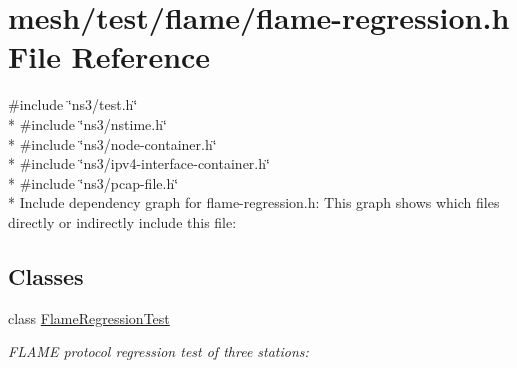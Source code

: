 \hypertarget{flame-regression_8h}{}\section{mesh/test/flame/flame-\/regression.h File Reference}
\label{flame-regression_8h}
{\ttfamily \#include \char`\"{}ns3/test.\+h\char`\"{}}\\*
{\ttfamily \#include \char`\"{}ns3/nstime.\+h\char`\"{}}\\*
{\ttfamily \#include \char`\"{}ns3/node-\/container.\+h\char`\"{}}\\*
{\ttfamily \#include \char`\"{}ns3/ipv4-\/interface-\/container.\+h\char`\"{}}\\*
{\ttfamily \#include \char`\"{}ns3/pcap-\/file.\+h\char`\"{}}\\*
Include dependency graph for flame-\/regression.h\+:
This graph shows which files directly or indirectly include this file\+:
\subsection*{Classes}
\begin{DoxyCompactItemize}
\item 
class \hyperlink{classFlameRegressionTest}{Flame\+Regression\+Test}
\begin{DoxyCompactList}\small\item\em F\+L\+A\+ME protocol regression test of three stations\+: \end{DoxyCompactList}\end{DoxyCompactItemize}
